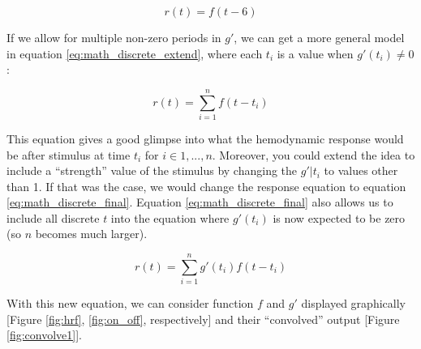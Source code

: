 \documentclass[11pt]{article}
\begin{document}
\begin{equation}  \label{eq:math_discrete}
r(t)=  f(t-6)
\end{equation}



If we allow for multiple non-zero periods in $g'$, we can get a more general 
model in equation \ref{eq:math_discrete_extend}, where each $t_i$ is a value 
when $g'(t_i) \neq 0$: 

\begin{equation}  \label{eq:math_discrete_extend}
r(t)= \sum_{i=1}^n f(t-t_i)
\end{equation}

This equation gives a good glimpse into what the hemodynamic response would be 
after stimulus at time $t_i$ for $i \in {1,...,n}$. Moreover, you could extend 
the idea to include a ``strength'' value of the stimulus by changing the 
$g'|t_i$ to values other than 1. If that was the case, we would change 
the response equation to equation \ref{eq:math_discrete_final}. Equation 
\ref{eq:math_discrete_final} also allows us to include all discrete $t$ into 
the equation where $g'(t_i)$ is now expected to be zero (so $n$ becomes much 
larger). 

\begin{equation}  \label{eq:math_discrete_final}
r(t)= \sum_{i=1}^n g'(t_i) f(t-t_i)
\end{equation}


With this new equation, we can consider function $f$ and $g'$ displayed 
graphically [Figure \ref{fig:hrf}, \ref{fig:on_off}, respectively] and 
their ``convolved'' output [Figure \ref{fig:convolve1}].
\end{document}
